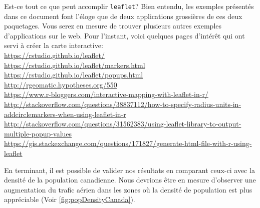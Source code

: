 \begin{moreInfo}{Est-ce tout ce que peut accomplir \texttt{leaflet}?}
	Bien entendu, les exemples présentés dans ce document font l'éloge que de deux applications grossières de ces deux paquetages. Vous serez en mesure de trouver plusieurs autres exemples d'applications sur le web. Pour l'instant, voici quelques pages d'intérêt qui ont servi à créer la carte interactive: \\
	\url{https://rstudio.github.io/leaflet/} \\
	\url{https://rstudio.github.io/leaflet/markers.html} \\
	\url{https://rstudio.github.io/leaflet/popups.html} \\
	\url{http://rgeomatic.hypotheses.org/550} \\
	\url{https://www.r-bloggers.com/interactive-mapping-with-leaflet-in-r/} \\
	\url{http://stackoverflow.com/questions/38837112/how-to-specify-radius-units-in-addcirclemarkers-when-using-leaflet-in-r} \\
	\url{http://stackoverflow.com/questions/31562383/using-leaflet-library-to-output-multiple-popup-values} \\
	\url{https://gis.stackexchange.com/questions/171827/generate-html-file-with-r-using-leaflet}
\end{moreInfo}

En terminant, il est possible de valider nos résultats en comparant ceux-ci avec la densité de la population canadienne. Nous devrions être en mesure d'observer une augmentation du trafic aérien dans les zones où la densité de population est plus appréciable (Voir \autoref{fig:popDensityCanada}). 

